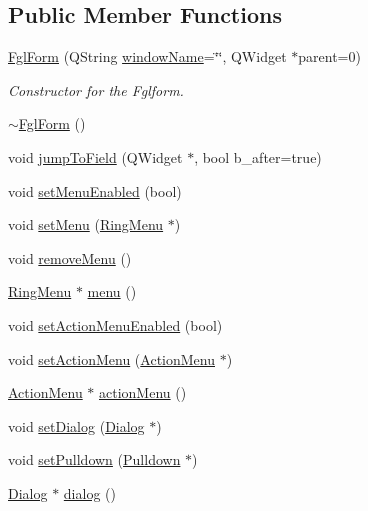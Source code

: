 \subsection*{Public Member Functions}
\begin{DoxyCompactItemize}
\item 
\hyperlink{classFglForm_a4a6d10fc6cce5a7984d59b80730cd7e1}{FglForm} (QString \hyperlink{classFglForm_a154084978ed81b8739db7197541881f5}{windowName}=\char`\"{}\char`\"{}, QWidget $\ast$parent=0)
\begin{DoxyCompactList}\small\item\em Constructor for the Fglform. \item\end{DoxyCompactList}\item 
\hyperlink{classFglForm_a14fc02c52beeeffefa92a4b3425da772}{$\sim$FglForm} ()
\item 
void \hyperlink{classFglForm_a626014edfd45271d30f38d877601abd5}{jumpToField} (QWidget $\ast$, bool b\_\-after=true)
\item 
void \hyperlink{classFglForm_acfb920aa37d488d2877fe75441ac7f65}{setMenuEnabled} (bool)
\item 
void \hyperlink{classFglForm_a0060da33eb1943f1b762e8a164ede398}{setMenu} (\hyperlink{classRingMenu}{RingMenu} $\ast$)
\item 
void \hyperlink{classFglForm_a7b0af358781bf6b0f37d80e9383cf10e}{removeMenu} ()
\item 
\hyperlink{classRingMenu}{RingMenu} $\ast$ \hyperlink{classFglForm_acffbcaf62fc53ff47363cf13b2967242}{menu} ()
\item 
void \hyperlink{classFglForm_ab322288b13021e7b98a5cf87912d2f18}{setActionMenuEnabled} (bool)
\item 
void \hyperlink{classFglForm_acdc54b976403abededb061ba2dd0c30f}{setActionMenu} (\hyperlink{classActionMenu}{ActionMenu} $\ast$)
\item 
\hyperlink{classActionMenu}{ActionMenu} $\ast$ \hyperlink{classFglForm_aa7339ffc3aa81015c493104643fde6a1}{actionMenu} ()
\item 
void \hyperlink{classFglForm_aee2921f4bcb8f95e10fde25ec84842d3}{setDialog} (\hyperlink{classDialog}{Dialog} $\ast$)
\item 
void \hyperlink{classFglForm_a19892721571e2c56399ca6be07c3f750}{setPulldown} (\hyperlink{classPulldown}{Pulldown} $\ast$)
\item 
\hyperlink{classDialog}{Dialog} $\ast$ \hyperlink{classFglForm_ace102516f1523e1ea87c64f2db1ea30e}{dialog} ()

\end{DoxyCompactItemize}
